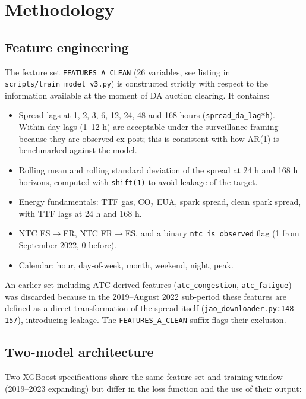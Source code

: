 \documentclass[11pt,a4paper]{article}
\begin{document}
\section{Methodology}\label{sec:methodology}

\subsection{Feature engineering}\label{sec:features}

The feature set \texttt{FEATURES\_A\_CLEAN} (26 variables, see
listing in \texttt{scripts/train\_model\_v3.py}) is constructed
strictly with respect to the information available at the moment of
DA auction clearing. It contains:

\begin{itemize}
\item Spread lags at 1, 2, 3, 6, 12, 24, 48 and 168 hours
(\texttt{spread\_da\_lag*h}). Within-day lags (1--12 h) are
acceptable under the surveillance framing because they are observed
ex-post; this is consistent with how AR(1) is benchmarked against
the model.
\item Rolling mean and rolling standard deviation of the spread at
24 h and 168 h horizons, computed with \texttt{shift(1)} to avoid
leakage of the target.
\item Energy fundamentals: TTF gas, CO$_2$ EUA, spark spread, clean
spark spread, with TTF lags at 24 h and 168 h.
\item NTC ES$\to$FR, NTC FR$\to$ES, and a binary
\texttt{ntc\_is\_observed} flag (1 from September 2022, 0 before).
\item Calendar: hour, day-of-week, month, weekend, night, peak.
\end{itemize}

An earlier set including ATC-derived features
(\texttt{atc\_congestion}, \texttt{atc\_fatigue}) was discarded
because in the 2019--August 2022 sub-period these features are
defined as a direct transformation of the spread itself
(\texttt{jao\_downloader.py:148--157}), introducing leakage. The
\texttt{FEATURES\_A\_CLEAN} suffix flags their exclusion.

\subsection{Two-model architecture}\label{sec:architecture}

Two XGBoost specifications share the same feature set and training
window (2019--2023 expanding) but differ in the loss function and
the use of their output:
\end{document}
